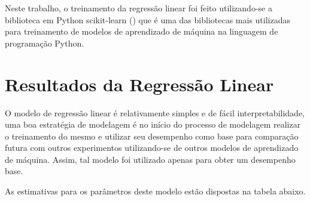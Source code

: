 Neste trabalho, o treinamento da regressão linear foi feito utilizando-se a biblioteca em Python scikit-learn (\citet{Sklearn}) que é uma das bibliotecas mais utilizadas para treinamento de modelos de aprendizado de máquina na linguagem de programação Python.

\section{Resultados da Regressão Linear}
\label{sec:resultados_regressao_linear}

O modelo de regressão linear é relativamente simples e de fácil interpretabilidade, uma boa estratégia de modelagem é no início do processo de modelagem realizar o treinamento do mesmo e utilizar seu desempenho como base para comparação futura com outros experimentos utilizando-se de outros modelos de aprendizado de máquina. Assim, tal modelo foi utilizado apenas para obter um desempenho base.

As estimativas para os parâmetros deste modelo estão dispostas na tabela abaixo.

